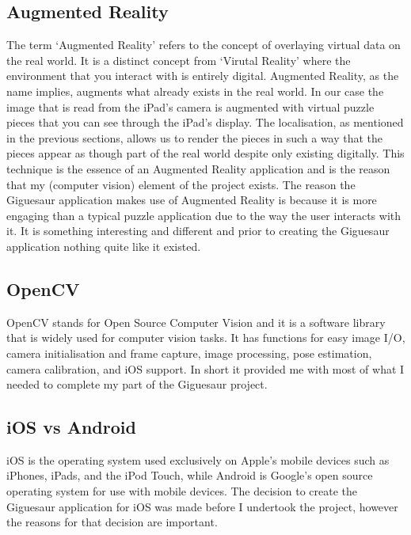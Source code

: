 \documentclass{article}
\begin{document}
\subsection{Augmented Reality}
The term `Augmented Reality' refers to the concept of overlaying virtual data on the real world. It is a distinct concept from `Virutal Reality' where the environment that you interact with is entirely digital. Augmented Reality, as the name implies, augments what already exists in the real world. In our case the image that is read from the iPad's camera is augmented with virtual puzzle pieces that you can see through the iPad's display. The localisation, as mentioned in the previous sections, allows us to render the pieces in such a way that the pieces appear as though part of the real world despite only existing digitally. This technique is the essence of an Augmented Reality application and is the reason that my (computer vision) element of the project exists. The reason the Giguesaur application makes use of Augmented Reality is because it is more engaging than a typical puzzle application due to the way the user interacts with it. It is something interesting and different and prior to creating the Giguesaur application nothing quite like it existed. 


\subsection{OpenCV}

OpenCV stands for Open Source Computer Vision and it is a software library that is widely used for computer vision tasks. It has functions for easy image I/O, camera initialisation and frame capture, image processing, pose estimation, camera calibration, and iOS support. In short it provided me with most of what I needed to complete my part of the Giguesaur project.

\subsection{iOS vs Android}


iOS is the operating system used exclusively on Apple's mobile devices such as iPhones, iPads, and the iPod Touch, while Android is Google's open source operating system for use with mobile devices. The decision to create the Giguesaur application for iOS was made before I undertook the project, however the reasons for that decision are important. 
\end{document}
